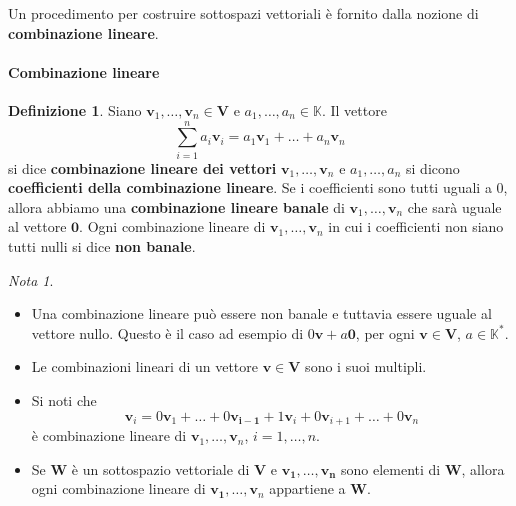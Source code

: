 \documentclass{article}
\theoremstyle{plain}
\theoremstyle{definition}
\newtheorem{defn}{Definizione}[section]
\theoremstyle{remark}
\newtheorem{note}{Nota}
\begin{document}
\vspace{10pt}

Un procedimento per costruire sottospazi vettoriali è fornito dalla nozione di \textbf{combinazione lineare}.

\vspace{10pt}

\paragraph{Combinazione lineare}
\begin{bxthm}
\begin{defn}
    Siano \( \mathbf{v}_1, \ldots, \mathbf{v}_n \in \mathbf{V} \) e \( a_1, \ldots, a_n \in \mathbb{K} \). 
    Il vettore
    \[ 
        \sum_{i=1}^{n}a_i\mathbf{v}_i=a_1\mathbf{v}_1 + \ldots + a_n\mathbf{v}_n
    \]
    si dice \textbf{combinazione lineare dei vettori} \( \mathbf{v}_1, \ldots, \mathbf{v}_n \) e \(a_1,\ldots,a_n\) si dicono \textbf{coefficienti della combinazione lineare}.
    Se i coefficienti sono tutti uguali a $0$, allora abbiamo una \textbf{combinazione lineare banale} di \( \mathbf{v}_1, \ldots, \mathbf{v}_n \) che sarà uguale al vettore $\mathbf{0}$.
    Ogni combinazione lineare di \( \mathbf{v}_1, \ldots, \mathbf{v}_n \) in cui i coefficienti non siano tutti nulli si dice \textbf{non banale}.
\end{defn}
\end{bxthm}

\vspace{10pt}

\begin{note}\hfill
    \begin{itemize}
        \item Una combinazione lineare può essere non banale e tuttavia essere uguale al vettore nullo. 
        Questo è il caso ad esempio di \( 0\mathbf{v} + a\mathbf{0} \), per ogni \( \mathbf{v} \in \mathbf{V} \), \( a \in \mathbb{K}^* \).
        \item Le combinazioni lineari di un vettore \( \mathbf{v} \in \mathbf{V} \) sono i suoi multipli.
        \item Si noti che
        \[ 
            \mathbf{v}_i = 0\mathbf{v}_1 + \ldots + 0\mathbf{v_{i-1}} + 1\mathbf{v}_i + 0\mathbf{v}_{i+1} + \ldots + 0\mathbf{v}_n 
        \]
        è combinazione lineare di \( \mathbf{v}_1, \ldots, \mathbf{v}_n \), \( i = 1, \ldots, n \).
        \item Se \( \mathbf{W} \) è un sottospazio vettoriale di \( \mathbf{V} \) e \( \mathbf{v_1}, \ldots, \mathbf{v_n} \) sono elementi di \( \mathbf{W} \), 
        allora ogni combinazione lineare di \( \mathbf{v_1}, \ldots, \mathbf{v}_n \) appartiene a \( \mathbf{W} \).
    \end{itemize}
    
\end{note}
\end{document}
